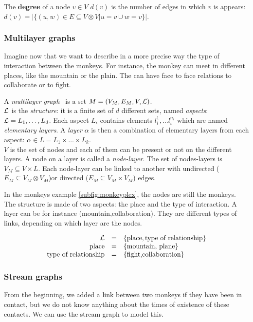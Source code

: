 \documentclass{svproc}
\begin{document}
The {\bf degree} of a node $v\in V$ $d(v)$ is the number of edges in which $v$ is appears: $d(v)=|\{(u,w) \in E \subseteq V \otimes V| u=v \cup w=v\}|$.

\subsubsection{Multilayer graphs}
%
Imagine now that we want to describe in a more precise way the type of interaction between the monkeys. For instance, the monkey can meet in different places, like the mountain or the plain. The can have face to face relations to collaborate or to fight.

A {\em multilayer graph}~\cite{mlkiv,mldd} is a set $M=(V_M,E_M,V,{\cal L})$.\\
${\cal L}$ is the {\em structure}: it is a finite set of $d$ different sets, named {\em aspects}: ${\cal L} = L_1, \dots, L_d$. Each aspect $L_i$ contains elements $l_i^1,\dots l_i^{n_i}$ which are named {\em elementary layers}. A {\em layer} $\alpha$ is then a combination of elementary layers from each aspect: $\alpha \in L=L_1\times \dots \times L_k$. \\
$V$ is the set of nodes and each of them can be present or not on the different layers. A node on a layer is called a {\em node-layer}. The set of nodes-layers is $V_M \subseteq V \times L$. Each node-layer can be linked to another with undirected ($E_M\subseteq V_M \otimes V_M$)or directed ($E_M \subseteq V_M \times V_M$) edges.

In the monkeys example \cref{subfig:monkeyplex}, the nodes are still the monkeys. The structure is made of two aspects: the place and the type of interaction. A layer can be for instance (mountain,collaboration). They are different types of links, depending on which layer are the nodes.

\begin{equation}
\begin{array}{rcl}
  {\cal L}&=&\{\text{place},\text{type of relationship}\} \\
  \text{place} &=& \{\text{mountain, plane}\}\\
 \text{type of relationship} &=& \{ \text{fight,collaboration}\}
\end{array}
\end{equation}

\subsubsection{Stream graphs}
From the beginning, we added a link between two monkeys if they have been in contact, but we do not know anything about the times of existence of these contacts. We can use the stream graph to model this.
\end{document}
